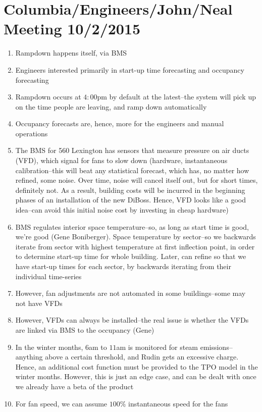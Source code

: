 \documentclass[12pt,a4paper]{article}
\begin{document}
	\section{Columbia/Engineers/John/Neal Meeting 10/2/2015}
	\begin{enumerate}
	\item Rampdown happens itself, via BMS
	\item Engineers interested primarily in start-up time forecasting and 
	occupancy forecasting
	\item Rampdown occurs at $4:00$pm by default at the latest--the system will
	pick up on the time people are leaving, and ramp down automatically
	\item Occupancy forecasts are, hence, more for the engineers and manual
	operations
	\item The BMS for 560 Lexington has sensors that measure pressure on air 
	ducts (VFD), which signal for fans to slow down (hardware, instantaneous
	calibration--this will beat any statistical forecast, which has, no matter 
	how refined, some noise. Over time, noise will cancel itself out, but for
	short times, definitely not. As a result, building costs will be incurred 
	in the beginning phases of an installation of the new DiBoss. Hence, VFD 
	looks like a good idea--can avoid this initial noise cost by investing in 
	cheap hardware)
	\item BMS regulates interior space temperature--so, as long as start time 
	is good, we're good (Gene Boniberger). Space temperature by sector--so we 
	backwards iterate from sector with highest temperature at first inflection 
	point, in order to determine start-up time for whole building. Later, can 
	refine so that we have start-up times for each sector, by backwards 
	iterating from their individual time-series
	\item However, fan adjustments are not automated in some buildings--some 
	may not have VFDs
	\item However, VFDs can always be installed--the real issue is whether
	the VFDs are linked via BMS to the occupancy (Gene)
	\item In the winter months, $6$am to $11$am is monitored for steam 
	emissions--anything above a certain threshold, and Rudin gets an excessive 
	charge. Hence, an additional cost function must be provided to the TPO 
	model in the winter months. However, this is just an edge case, and can be 
	dealt with once we already have a beta of the product
	\item For fan speed, we can assume $100\%$ instantaneous speed for the fans

\end{enumerate}
\end{document}
